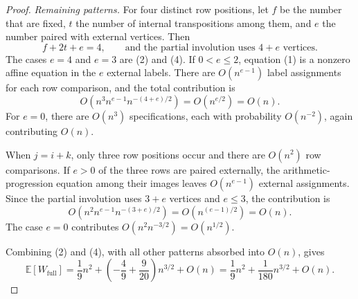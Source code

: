 \documentclass[10pt,a4paper]{amsart}
\begin{document}
\begin{proof}
\emph{Remaining patterns.}
For four distinct row positions, let $f$ be the number that are fixed,
$t$ the number of internal transpositions among them, and $e$ the number
paired with external vertices.  Then
\[
f+2t+e=4,
\qquad\text{and the partial involution uses }4+e\text{ vertices}.
\]
The cases $e=4$ and $e=3$ are (2) and (4).  If $0<e\leq2$, equation (1)
is a nonzero affine equation in the $e$ external labels.  There are
$O(n^{e-1})$ label assignments for each row comparison, and the total
contribution is
\[
O\!\left(n^3 n^{e-1} n^{-(4+e)/2}\right)=O(n^{e/2})=O(n).
\]
For $e=0$, there are $O(n^3)$ specifications, each with probability
$O(n^{-2})$, again contributing $O(n)$.

When $j=i+k$, only three row positions occur and there are $O(n^2)$ row
comparisons.  If $e>0$ of the three rows are paired externally, the
arithmetic-progression equation among their images leaves
$O(n^{e-1})$ external assignments.  Since the partial involution uses
$3+e$ vertices and $e\leq3$, the contribution is
\[
O\!\left(n^2n^{e-1}n^{-(3+e)/2}\right)=O(n^{(e-1)/2})=O(n).
\]
The case $e=0$ contributes
$O(n^2n^{-3/2})=O(n^{1/2})$.

Combining (2) and (4), with all other patterns absorbed into $O(n)$,
gives
\[
\mathbb{E}[W_{\mathrm{full}}]
=\frac19n^2+
\left(-\frac49+\frac9{20}\right)n^{3/2}+O(n)
=\frac19n^2+\frac1{180}n^{3/2}+O(n).
\]
\end{proof}
\end{document}
